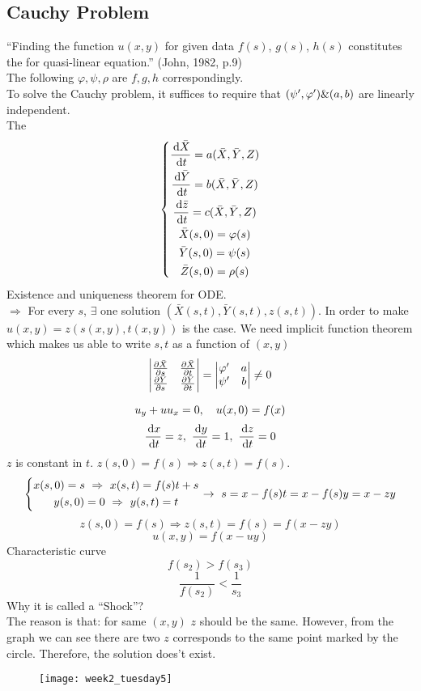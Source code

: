 \subsection{Cauchy Problem}
``Finding the function $u(x,y)$ for given data $f(s)$, $g(s)$, $h(s)$ constitutes the  for quasi-linear equation.'' (John, 1982, p.9)\\ The following $\varphi, \psi, \rho$ are $f, g, h$ correspondingly.\\
To solve the Cauchy problem, it suffices to require that $(\psi^{\prime},\varphi^{\prime})\&(a,b)$ are linearly independent.\\The
\[\left\{\begin{gathered}\frac{\,\mathrm{d}\bar{X}}{\,\mathrm{d} t}=a(\bar{X},\bar{Y},Z)\\\frac{\,\mathrm{d}\bar{Y}}{\,\mathrm{d} t}=b(\bar{X},\bar{Y},Z)\\\frac{\,\mathrm{d}\bar{z}}{\,\mathrm{d} t}=c(\bar{X},\bar{Y},Z)\\\bar{X}(s,0)=\varphi(s)\\\bar{Y}(s,0)=\psi(s)\\\bar{Z}(s,0)=\rho(s)\end{gathered}\right.
\]
Existence and uniqueness theorem for ODE.\\
$\Rightarrow$ For every $s$, $\exists$ one solution $(\bar{X}(s,t),\bar{Y}(s,t),z(s,t))$. In order to make $u(x,y)=z(s(x,y),t(x,y))$ is the case. We need implicit function theorem which makes us able to write $s, t$ as a function of $(x,y)$
\[\begin{vmatrix}\frac{\partial{\bar{X}}}{\partial{s}}&\frac{\partial{\bar{X}}}{\partial{t}}\\\frac{\partial{\bar{Y}}}{\partial{s}}&\frac{\partial{\bar{Y}}}{\partial{t}}\end{vmatrix}=\begin{vmatrix}\varphi^{\prime}&a\\\psi^{\prime}&b\end{vmatrix}\neq0
\]
\begin{example}
\[u_y+uu_x=0, \quad u(x,0)=f(x)\]
\[\frac{\,\mathrm{d} x}{\,\mathrm{d} t}=z,~\frac{\,\mathrm{d} y}{\,\mathrm{d} t}=1,~\frac{\,\mathrm{d} z}{\,\mathrm{d} t}=0
\]
$z$ is constant in $t$. $z(s, 0)=f(s)\Rightarrow z(s,t)=f(s)$.
\[\left\{\begin{gathered}x(s,0)=s~\Rightarrow~x(s,t)=f(s)t+s\\y(s,0)=0~\Rightarrow~y(s,t)=t\end{gathered}\right.\rightarrow ~s=x-f(s)t=x-f(s)y=x-zy
\]
\[z(s,0)=f(s)\Rightarrow z(s,t)=f(s)=f(x-zy)
\]
\[u(x,y)=f(x-uy)
\]
Characteristic curve
\[f(s_2)>f(s_3)
\]
\[\frac{1}{f(s_2)}<\frac{1}{s_3}
\]
Why it is called a ``Shock''?\\The reason is that: for same $(x,y)$ $z$ should be the same. However, from the graph we can see there are two $z$ corresponds to the same point marked by the circle. Therefore, the solution does't exist.
\begin{figure}[H]
\centering
\texttt{[image: week2\_tuesday5]}
\end{figure}



\end{example}
